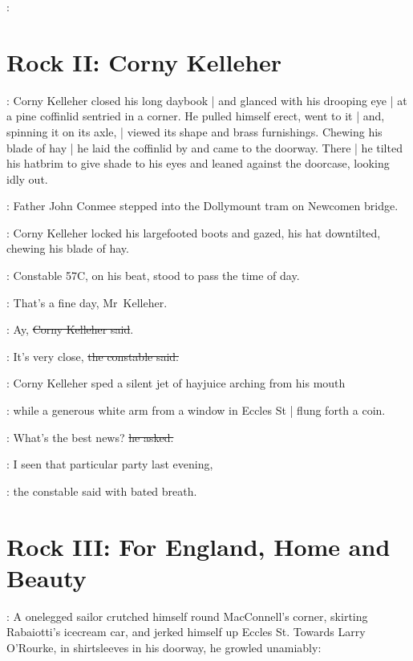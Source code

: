 \conmeeint:


\section*{Rock II: Corny Kelleher}

:
Corny Kelleher closed his long daybook |
and glanced with his drooping eye |
at a pine coffinlid sentried in a corner.
He pulled himself erect,
went to it |
and, spinning it on its axle, |
viewed its shape and brass furnishings.%
Chewing his blade of hay |
he laid the coffinlid by and came to the doorway.
There |
he tilted his hatbrim to give shade to his eyes
and leaned against the doorcase,
looking idly out.

\begin{interject}
    :
    Father John Conmee stepped into the Dollymount tram on Newcomen bridge.
\end{interject}

:
Corny Kelleher locked his largefooted boots and gazed,
his hat downtilted,
chewing his blade of hay.

:
Constable 57C,
on his beat,
stood to pass the time of day.

\constable:
That's a fine day, Mr~Kelleher.

\corny:
Ay, \sout{Corny Kelleher said}.

\constable:
It's very close,%
\sout{the constable said.}

:
Corny Kelleher sped a silent jet of hayjuice arching from his mouth

\begin{interject}
    :
    while a generous white arm from a window in Eccles St |
    flung forth a coin.
\end{interject}

\corny:
What's the best news? \sout{he asked.}

\constable:
I seen that particular party last evening,

:
the constable said with bated breath.


\section*{Rock III: For England, Home and Beauty}

:
A onelegged sailor crutched himself round MacConnell's corner,
skirting Rabaiotti's icecream car,
and jerked himself up Eccles St.
Towards Larry O'Rourke,%
in shirtsleeves in his doorway,
he growled unamiably:

